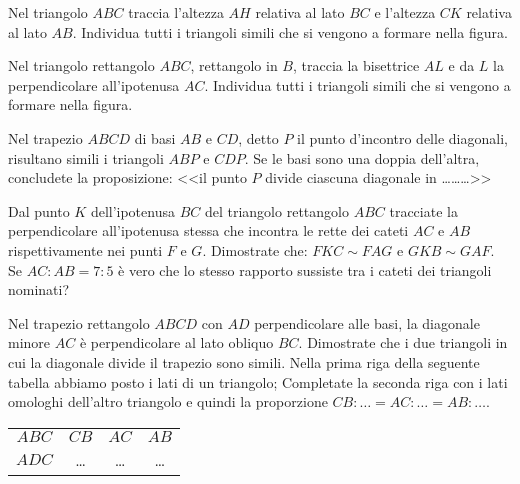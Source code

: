 \begin{multicols}{2}
\begin{esercizio}
\label{ese:6.58}
Nel triangolo $ABC$ traccia l'altezza $AH$ relativa al lato $BC$ e l'altezza $CK$ relativa al lato $AB$. Individua tutti i triangoli simili che si vengono a formare nella figura.
\end{esercizio}

\begin{esercizio}
\label{ese:6.59}
Nel triangolo rettangolo $ABC$, rettangolo in $B$, traccia la bisettrice $AL$ e da $L$ la perpendicolare all'ipotenusa $AC$. Individua tutti i triangoli simili che si vengono a formare nella figura.
\end{esercizio}

\begin{esercizio}
\label{ese:6.60}
Nel trapezio $ABCD$ di basi $AB$ e $CD$, detto $P$ il punto d'incontro delle diagonali, risultano simili i triangoli $ABP$ e $CDP$. Se le basi sono una doppia dell'altra, concludete la proposizione: <<il punto $P$ divide ciascuna diagonale in \ldots\ldots\ldots{}>>
\end{esercizio}

\begin{esercizio}
\label{ese:6.61}
Dal punto $K$ dell'ipotenusa $BC$ del triangolo rettangolo $ABC$ tracciate la perpendicolare all'ipotenusa stessa che incontra le rette dei cateti $AC$ e $AB$ rispettivamente nei punti $F$ e $G$. Dimostrate che: $FKC\sim FAG$ e $GKB\sim GAF$. Se $AC:AB=7:5$ è vero che lo stesso rapporto sussiste tra i cateti dei triangoli nominati?
\end{esercizio}

\begin{esercizio}
\label{ese:6.62}
Nel trapezio rettangolo $ABCD$ con $AD$ perpendicolare alle basi, la diagonale minore $AC$ è perpendicolare al lato obliquo $BC$. Dimostrate che i due triangoli in cui la diagonale divide il trapezio sono simili. Nella prima riga della seguente tabella abbiamo posto i lati di un triangolo; Completate la seconda riga con i lati omologhi dell'altro triangolo e quindi la proporzione $CB:\ldots{}=AC:\ldots{}=AB:\ldots{}$.

\begin{center}
\begin{tabular}{cccc}
\toprule
$ABC$ & $CB$ & $AC$ & $AB$\\
$ADC$ & \ldots{} & \ldots{} & \ldots{}\\
\bottomrule
\end{tabular}
\end{center}
\end{esercizio}


\end{multicols}
